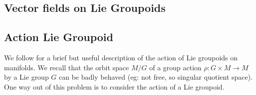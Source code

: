 \subsection{Vector fields on Lie Groupoids} %
\label{sub:vector_fields_on_lie_groupoids}

\subsection{Action Lie Groupoid} %
\label{sub:action_lie_groupoid}
We follow \citep{Jurco2019a} for a brief but useful description of the action of Lie groupoids on manifolds.
We recall that the orbit space  $M / G$ of a group action $\rho: G \times M \rightarrow M$ by a Lie group $G$ can be badly behaved (eg: not free, so singular quotient space). One way out of this problem is to consider the action of a Lie groupoid. \\




